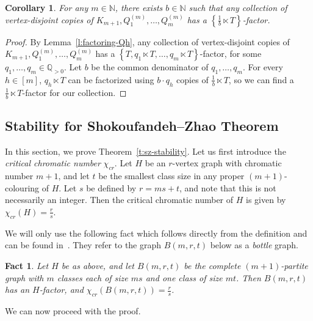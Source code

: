\documentclass[reqno, 12pt]{amsart}
\numberwithin{equation}{section}
\numberwithin{figure}{section}
\theoremstyle{plain}
\newtheorem{fact}[thm]{Fact}
\newtheorem{cor}[thm]{Corollary}
\theoremstyle{definition}
\def\NN{\mathds N}
\def\QQ{\mathds Q}
\begin{document}
    \begin{cor}\label{cor:T_packing}
    For any $m\in\NN$, there exists $b\in \NN$ such that any collection of vertex-disjoint copies of $K_{m+1}, Q_1^{(m)}, \dots, Q_m^{(m)}$ has a $\left\{\frac 1b\ltimes T\right\}$-factor.
    \end{cor}

    \begin{proof}
        By Lemma~\ref{l:factoring-Qh}, any collection of vertex-disjoint copies of $K_{m+1},Q_1^{(m)},\dots,Q_m^{(m)}$ has a $\left\{T,q_1\ltimes T, \dots , q_m\ltimes T\right\}$-factor, for some $q_1,\dots, q_m\in \QQ_{>0}$. Let $b$ be the common denominator of $q_1,\dots , q_m$. For every $h\in [m]$, $q_h\ltimes T$ can be factorized using $b\cdot q_h$ copies of $\frac 1b\ltimes T$, so we can find a $\frac 1b \ltimes T$-factor for our collection.
    \end{proof}

    \subsection{Stability for Shokoufandeh--Zhao Theorem}
        \label{sec:sz-stability}
        In this section, we prove Theorem~\ref{t:sz-stability}. Let us first introduce the \emph{critical chromatic number} $\chi_{cr}$. Let $H$ be an $r$-vertex graph with chromatic number $m+1$, and let $t$ be the smallest class size in any proper $(m+1)$-colouring of $H$. Let $s$ be defined by $r = ms+t$, and note that this is not necessarily an integer. Then the critical chromatic number of $H$ is given by $\chi_{cr}(H) = \frac{r}{s}$.
        
        We will only use the following fact which follows directly from the definition and can be found in~\cite{sz03}. They refer to the graph $B(m, r, t)$ below as a \textit{bottle} graph.

        \begin{fact}
        Let $H$ be as above, and let $B(m,r,t)$ be the complete $(m+1)$-partite graph with $m$ classes each of size $ms$ and one class of size $mt$. Then $B(m,r,t)$ has an $H$-factor, and $\chi_{cr}(B(m,r,t)) = \frac rs$.
        \end{fact}

        We can now proceed with the proof.
\end{document}
